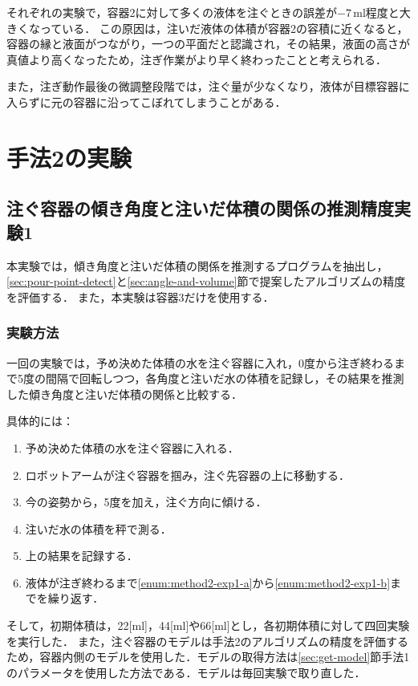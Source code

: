 	それぞれの実験で，容器2に対して多くの液体を注ぐときの誤差が$-7\, \mathrm{ml}$程度と大きくなっている．
	この原因は，注いだ液体の体積が容器2の容積に近くなると，容器の縁と液面がつながり，一つの平面だと認識され，その結果，液面の高さが真値より高くなったため，注ぎ作業がより早く終わったことと考えられる．
	
	また，注ぎ動作最後の微調整段階では，注ぐ量が少なくなり，液体が目標容器に入らずに元の容器に沿ってこぼれてしまうことがある．
		
\section{手法2の実験}\label{sec:method2-exp}
	\subsection{注ぐ容器の傾き角度と注いだ体積の関係の推測精度実験1}\label{sec:method2-exp1}
	本実験では，傾き角度と注いだ体積の関係を推測するプログラムを抽出し，\ref{sec:pour-point-detect}と\ref{sec:angle-and-volume}節で提案したアルゴリズムの精度を評価する．
	また，本実験は容器3だけを使用する．
	
		\subsubsection{実験方法}
		一回の実験では，予め決めた体積の水を注ぐ容器に入れ，0度から注ぎ終わるまで5度の間隔で回転しつつ，各角度と注いだ水の体積を記録し，その結果を推測した傾き角度と注いだ体積の関係と比較する．

		具体的には：
		\begin{enumerate}
			\item 予め決めた体積の水を注ぐ容器に入れる．
			\item ロボットアームが注ぐ容器を掴み，注ぐ先容器の上に移動する．
			\item\label{enum:method2-exp1-a} 今の姿勢から，5度を加え，注ぐ方向に傾ける．
			\item 注いだ水の体積を秤で測る．
			\item\label{enum:method2-exp1-b} 上の結果を記録する．
			\item 液体が注ぎ終わるまで\ref{enum:method2-exp1-a}から\ref{enum:method2-exp1-b}までを繰り返す．
		\end{enumerate}
	
		そして，初期体積は，22[ml]，44[ml]や66[ml]とし，各初期体積に対して四回実験を実行した．
		また，注ぐ容器のモデルは手法2のアルゴリズムの精度を評価するため，容器内側のモデルを使用した．モデルの取得方法は\ref{sec:get-model}節手法1のパラメータを使用した方法である．モデルは毎回実験で取り直した．
		
